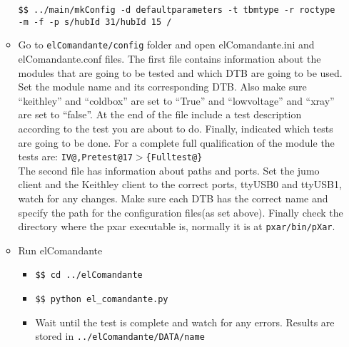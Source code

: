 \documentclass[12pt]{unlsilabsop}
\makeatletter
\newcommand{\at}{\makeatletter @\makeatother}
\makeatother
\begin{document}
\begin{enumerate}
\begin{itemize}
		\texttt{\$\$ ../main/mkConfig -d defaultparameters -t tbmtype -r roctype -m -f -p \textsc{}s/hubId 31/hubId 15 	\textsc{}/}
		\item Go to \texttt{elComandante/config} folder and open elComandante.ini and elComandante.conf files. The first file contains information about the modules that are going to be tested and which DTB are going to be used. Set the module name and its corresponding DTB. Also make sure ``keithley'' and ``coldbox'' are set to ``True'' and ``lowvoltage'' and ``xray'' are set to ``false''. At the end of the file include a test description according to the test you are about to do. Finally, indicated which tests are going to be done. For a complete full qualification of the module the tests are: \texttt{IV\at 17,Pretest{\at}17$>$\{Fulltest\at 17\}}\\

		The second file has information about paths and ports. Set the jumo client and the Keithley client to the correct ports, ttyUSB0 and ttyUSB1, watch for any changes. Make sure each DTB has the correct name and specify the path for the configuration files(as set above). Finally check the directory where the pxar executable is, normally it is at \texttt{pxar/bin/pXar}.
		\item Run elComandante
		\begin{itemize}
			\item \texttt{\$\$ cd ../elComandante}
			\item \texttt{\$\$ python el\_comandante.py}
			\item Wait until the test is complete and watch for any errors. Results are stored in \texttt{../elComandante/DATA/name}
		\end{itemize}
	\end{itemize}
   

\end{enumerate}
\end{document}
